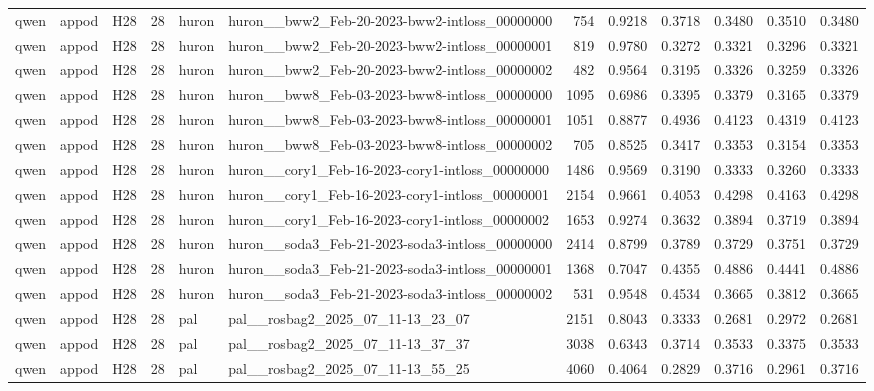 \begin{table}[tbp]
\begin{tabular}{lllrllrrrrrr}
qwen & appod & H28 & 28 & huron & huron\_\_bww2\_Feb-20-2023-bww2-intloss\_00000000 & 754 & 0.9218 & 0.3718 & 0.3480 & 0.3510 & 0.3480 \\
qwen & appod & H28 & 28 & huron & huron\_\_bww2\_Feb-20-2023-bww2-intloss\_00000001 & 819 & 0.9780 & 0.3272 & 0.3321 & 0.3296 & 0.3321 \\
qwen & appod & H28 & 28 & huron & huron\_\_bww2\_Feb-20-2023-bww2-intloss\_00000002 & 482 & 0.9564 & 0.3195 & 0.3326 & 0.3259 & 0.3326 \\
qwen & appod & H28 & 28 & huron & huron\_\_bww8\_Feb-03-2023-bww8-intloss\_00000000 & 1095 & 0.6986 & 0.3395 & 0.3379 & 0.3165 & 0.3379 \\
qwen & appod & H28 & 28 & huron & huron\_\_bww8\_Feb-03-2023-bww8-intloss\_00000001 & 1051 & 0.8877 & 0.4936 & 0.4123 & 0.4319 & 0.4123 \\
qwen & appod & H28 & 28 & huron & huron\_\_bww8\_Feb-03-2023-bww8-intloss\_00000002 & 705 & 0.8525 & 0.3417 & 0.3353 & 0.3154 & 0.3353 \\
qwen & appod & H28 & 28 & huron & huron\_\_cory1\_Feb-16-2023-cory1-intloss\_00000000 & 1486 & 0.9569 & 0.3190 & 0.3333 & 0.3260 & 0.3333 \\
qwen & appod & H28 & 28 & huron & huron\_\_cory1\_Feb-16-2023-cory1-intloss\_00000001 & 2154 & 0.9661 & 0.4053 & 0.4298 & 0.4163 & 0.4298 \\
qwen & appod & H28 & 28 & huron & huron\_\_cory1\_Feb-16-2023-cory1-intloss\_00000002 & 1653 & 0.9274 & 0.3632 & 0.3894 & 0.3719 & 0.3894 \\
qwen & appod & H28 & 28 & huron & huron\_\_soda3\_Feb-21-2023-soda3-intloss\_00000000 & 2414 & 0.8799 & 0.3789 & 0.3729 & 0.3751 & 0.3729 \\
qwen & appod & H28 & 28 & huron & huron\_\_soda3\_Feb-21-2023-soda3-intloss\_00000001 & 1368 & 0.7047 & 0.4355 & 0.4886 & 0.4441 & 0.4886 \\
qwen & appod & H28 & 28 & huron & huron\_\_soda3\_Feb-21-2023-soda3-intloss\_00000002 & 531 & 0.9548 & 0.4534 & 0.3665 & 0.3812 & 0.3665 \\
qwen & appod & H28 & 28 & pal & pal\_\_rosbag2\_2025\_07\_11-13\_23\_07 & 2151 & 0.8043 & 0.3333 & 0.2681 & 0.2972 & 0.2681 \\
qwen & appod & H28 & 28 & pal & pal\_\_rosbag2\_2025\_07\_11-13\_37\_37 & 3038 & 0.6343 & 0.3714 & 0.3533 & 0.3375 & 0.3533 \\
qwen & appod & H28 & 28 & pal & pal\_\_rosbag2\_2025\_07\_11-13\_55\_25 & 4060 & 0.4064 & 0.2829 & 0.3716 & 0.2961 & 0.3716 \\

\end{tabular}
\end{table}
